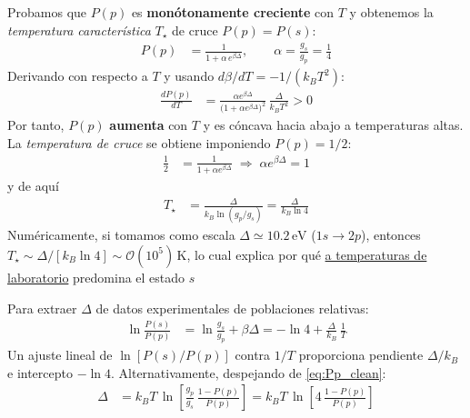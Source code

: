 \documentclass{article}
\begin{document}
Probamos que $P(p)$ es \textbf{monótonamente creciente} con $T$ y obtenemos la \textit{temperatura característica} $T_\star$ de cruce $P(p)=P(s)$:
\begin{equation}
\begin{split}
P(p) &= \frac{1}{1+\alpha\,e^{\beta\Delta}},\qquad \alpha=\frac{g_s}{g_p}=\frac{1}{4}
\end{split}\label{eq:Pp_alpha}
\end{equation}
Derivando con respecto a $T$ y usando $d\beta/dT=-1/(k_B T^2)$:
\begin{equation}
\begin{split}
\frac{dP(p)}{dT} 
&= \frac{\alpha e^{\beta\Delta}}{\big(1+\alpha e^{\beta\Delta}\big)^2}\,\frac{\Delta}{k_B T^2} > 0
\end{split}\label{eq:dP_dT}
\end{equation}
Por tanto, $P(p)$ \textbf{aumenta} con $T$ y es cóncava hacia abajo a temperaturas altas. La \textit{temperatura de cruce} se obtiene imponiendo $P(p)=1/2$:
\begin{equation}
\begin{split}
\frac{1}{2} &= \frac{1}{1+\alpha e^{\beta\Delta}} 
\;\Longrightarrow\; \alpha e^{\beta\Delta}=1
\end{split}\label{eq:half_cond}
\end{equation}
y de aquí 
\begin{equation}
\begin{split}
T_\star &= \frac{\Delta}{k_B \ln(g_p/g_s)} = \frac{\Delta}{k_B \ln 4}
\end{split}\label{eq:T_star}
\end{equation}
Numéricamente, si tomamos como escala $\Delta\simeq 10.2\,\text{eV}$ ($1s\!\to\!2p$), entonces $T_\star\sim \Delta/[k_B\ln 4]\sim \mathcal{O}(10^5)\,\text{K}$, lo cual explica por qué \underline{a temperaturas de laboratorio} predomina el estado $s$



Para extraer $\Delta$ de datos experimentales de poblaciones relativas:
\begin{equation}
\begin{split}
\ln\!\frac{P(s)}{P(p)} &= \ln\!\frac{g_s}{g_p} + \beta\Delta 
= -\ln 4 + \frac{\Delta}{k_B}\,\frac{1}{T}
\end{split}\label{eq:linear_fit}
\end{equation}
Un ajuste lineal de $\ln[P(s)/P(p)]$ contra $1/T$ proporciona pendiente $\Delta/k_B$ e intercepto $-\ln 4$. Alternativamente, despejando de \eqref{eq:Pp_clean}:
\begin{equation}
\begin{split}
\Delta &= k_B T\,\ln\!\left[\frac{g_p}{g_s}\,\frac{1-P(p)}{P(p)}\right]
= k_B T\,\ln\!\left[4\,\frac{1-P(p)}{P(p)}\right]
\end{split}\label{eq:delta_from_P}
\end{equation}
\end{document}
